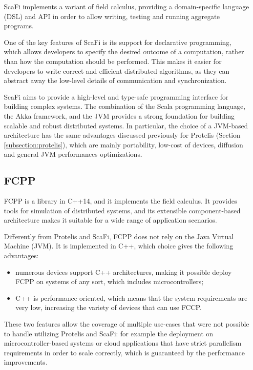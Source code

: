 ScaFi implements a variant of field calculus, providing a domain-specific language (DSL) and API in order to allow writing, testing and running aggregate programs.

One of the key features of ScaFi is its support for declarative programming, which allows developers to specify the desired outcome of a computation, rather than how the computation should be performed. This makes it easier for developers to write correct and efficient distributed algorithms, as they can abstract away the low-level details of communication and synchronization.

ScaFi aims to provide a high-level and type-safe programming interface for building complex systems.\newline
The combination of the Scala programming language, the Akka framework, and the JVM provides a strong foundation for building scalable and robust distributed systems.\newline
In particular, the choice of a JVM-based architecture has the same advantages discussed previously for Protelis (Section \ref{subsection:protelis}), which are mainly portability, low-cost of devices, diffusion and general JVM performances optimizations.

\subsection{FCPP}\label{subsection:fcpp}
FCPP \cite{fcpp_introduction} is a library in C++14, and it implements the field calculus.\newline
It provides tools for simulation of distributed systems, and its extensible component-based architecture makes it suitable for a wide range of application scenarios.

Differently from Protelis and ScaFi, FCPP does not rely on the Java Virtual Machine (JVM). It is implemented in C++, which choice gives the following advantages:
\begin{itemize}
    \item numerous devices support C++ architectures, making it possible deploy FCPP on systems of any sort, which includes microcontrollers;
    \item C++ is performance-oriented, which means that the system requirements are very low, increasing the variety of devices that can use FCCP.
\end{itemize}

These two features allow the coverage of multiple use-cases that were not possible to handle utilizing Protelis and ScaFi: for example the deployment on microcontroller-based systems or cloud applications that have strict parallelism requirements in order to scale correctly, which is guaranteed by the performance improvements.

